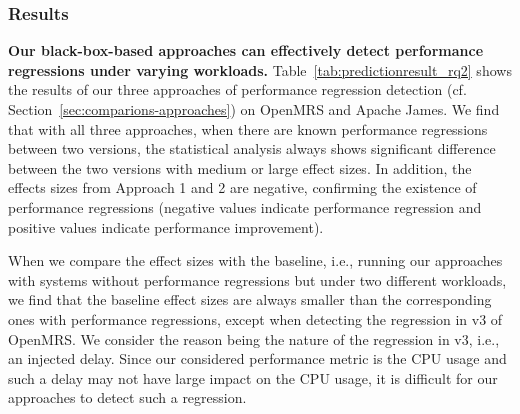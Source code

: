 \subsubsection*{Results}

\noindent\textbf{Our black-box-based approaches can effectively detect performance regressions under varying workloads.}
Table~\ref{tab:predictionresult_rq2} shows the results of our three approaches of performance regression detection (cf. Section~\ref{sec:comparions-approaches}) on OpenMRS and Apache James. We find that with all three approaches, when there are known performance regressions between two versions, the statistical analysis always shows significant difference between the two versions with medium or large effect sizes. In addition, the effects sizes from Approach 1 and 2 are negative, confirming the existence of performance regressions (negative values indicate performance regression and positive values indicate performance improvement). 

When we compare the effect sizes with the baseline, i.e., running our approaches with systems without performance regressions but under two different workloads, we find that the baseline effect sizes are always smaller than the corresponding ones with performance regressions, except when detecting the regression in v3 of OpenMRS. We consider the reason being the nature of the regression in v3, i.e., an injected delay. Since our considered performance metric is the CPU usage and such a delay may not have large impact on the CPU usage, it is difficult for our approaches to detect such a regression. 


